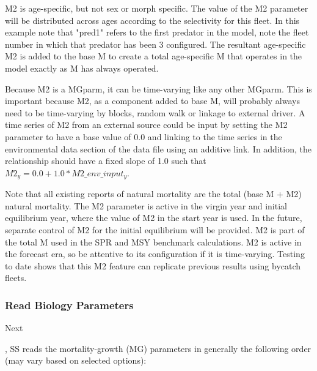 M2 is age-specific, but not sex or morph specific. The value of the M2 parameter will be distributed across ages according to the selectivity for this fleet. In this example note that "pred1" refers to the first predator in the model, note the fleet number in which that predator has been 3 configured. The resultant age-specific M2 is added to the base M to create a total age-specific M that operates in the model exactly as M has always operated. 

Because M2 is a MGparm, it can be time-varying like any other MGparm. This is important because M2, as a component added to base M, will probably always need to be time-varying by blocks, random walk or linkage to external driver. A time series of M2 from an external source could be input by setting the M2 parameter to have a base value of 0.0 and linking to the time series in the environmental data section of the data file using an additive link. In addition, the relationship should have a fixed slope of 1.0 such that $M2_y = 0.0 + 1.0 * M2\_env\_input_y$. 

Note that all existing reports of natural mortality are the total (base M + M2) natural mortality. The M2 parameter is active in the virgin year and initial equilibrium year, where the value of M2 in the start year is used. In the future, separate control of M2 for the initial equilibrium will be provided. M2 is part of the total M used in the SPR and MSY benchmark calculations. M2 is active in the forecast era, so be attentive to its configuration if it is time-varying. Testing to date shows that this M2 feature can replicate previous results using bycatch fleets.

\subsubsection{Read Biology Parameters}
\hypertarget{MGorder}{Next}, SS reads the mortality-growth (MG) parameters in generally the following order (may vary based on selected options):


